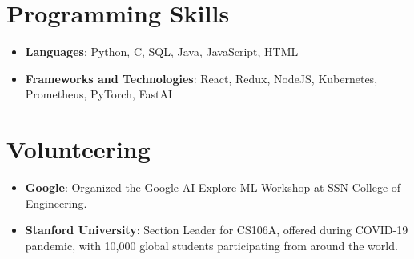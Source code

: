 \documentclass[letterpaper,11pt]{article}
\newcommand{\resumeItem}[2]{
  \item\small{
    \textbf{#1}{: #2 \vspace{-2pt}}
  }
}
\newcommand{\resumeSubHeadingListStart}{\begin{itemize}[leftmargin=*]}
\newcommand{\resumeSubHeadingListEnd}{\end{itemize}}
\begin{document}
\section{Programming Skills}
  \resumeSubHeadingListStart
   \item{
     \textbf{Languages}{: Python, C,  SQL, Java, JavaScript, HTML}
      }
      \item{
       \textbf{Frameworks and Technologies}{: React, Redux, NodeJS, Kubernetes, Prometheus, PyTorch, FastAI}
    }
  \resumeSubHeadingListEnd

\section{Volunteering}
\resumeSubHeadingListStart
\resumeItem{Google}{Organized the Google AI Explore ML Workshop at SSN College of Engineering.}
\resumeItem{Stanford University}{Section Leader for CS106A, offered during COVID-19 pandemic, with 10,000 global students participating from around the world.}
\resumeSubHeadingListEnd
\end{document}
